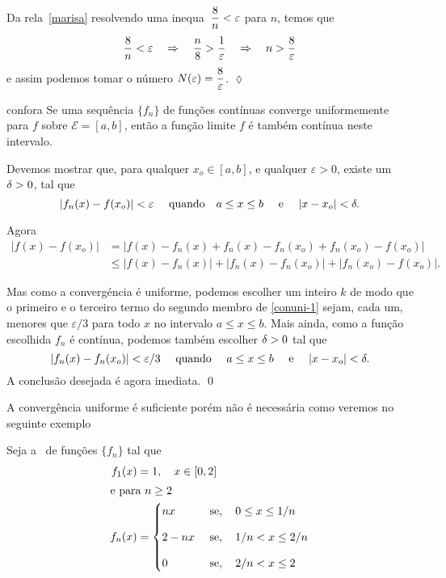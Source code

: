 Da rela\cao\ \eqref{marisa} resolvendo uma inequa\cao\
$\displaystyle{\frac{8}{n}< \varepsilon}$  para $n$, temos que
$$
\frac{8}{n}< \varepsilon\quad \Rightarrow \quad \frac{n}{8}>
\frac{1}{\varepsilon}\quad  \Rightarrow \quad n > \frac{8}{\varepsilon}
$$
e assim podemos tomar o número
$N(\varepsilon)=\displaystyle{\frac{8}{\varepsilon}}$. \hfill \(\lozenge\)

\begin{theoc}{}{confora}
Se uma sequência $\{f_n\}$ de funções contínuas converge
uniformemente para $f$ sobre $\mathcal{E}=[a, b]$, então a função
limite $f$ é também contínua neste intervalo.
\end{theoc}

\prova Devemos mostrar que, para qualquer $x_o\in [a, b]$, e
qualquer $\varepsilon>0$, existe um $\delta> 0$, tal que
$$
|f_n(x)-f(x_o)| < \varepsilon\quad \text{ quando}\quad  a\leq
x\leq b \quad \text{ e }\quad  |x-x_o| <\delta.
$$

Agora
\begin{align}\label{conuni-1}
|f(x) - f(x_o)| &= |f(x) - f_n(x) + f_n(x) - f_n(x_o) + f_n(x_o)
-f(x_o)|\nonumber\\[2ex]
&\leq |f(x) -f_n(x)| + |f_n(x) - f_n(x_o)| + |f_n(x_o)- f(x_o)|.
\end{align}

Mas como a convergéncia é uniforme, podemos escolher um inteiro
$k$ de modo que o primeiro e o terceiro termo do segundo membro de
\eqref{conuni-1} sejam, cada um, menores que $\varepsilon/3$ para
todo $x$ no intervalo $a \leq x \leq b$. Mais ainda, como a função
escolhida $f_n$ é contínua, podemos também escolher $\delta > 0$ tal
que
\[
|f_n(x)-f_n(x_o)| < \varepsilon/3\quad \text{ quando }\quad  a\leq
x\leq b \quad \text{ e }\quad  |x-x_o| <\delta.
\]
A conclusão desejada é agora imediata. \qed

A convergência uniforme é suficiente porém não é necessária como
veremos no seguinte exemplo
\begin{exer}\label{reve-1}
Seja a \seq\ de funções $\{f_n\}$ tal que
\begin{align*}
    f_1(x)&=1,\quad x\in [0,2]\\
    \intertext{e para  $n\ge 2$}
f_n(x) &=
  \begin{cases}
    nx & \text{ se}, \quad 0\le x \le 1/n \\[2ex]
    2-nx & \text{ se},\quad 1/n<x\le 2/n\\[2ex]
    0 &\text{ se}, \quad  2/n<x\le 2
  \end{cases}
\end{align*}
\end{exer}

